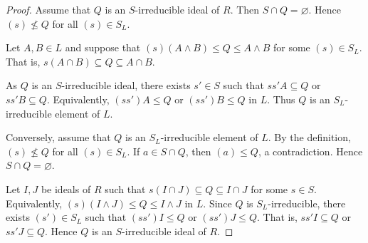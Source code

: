 \documentclass[10pt,a4paper]{amsart}
\begin{document}
\begin{proof}
	Assume that $Q$ is an $S$-irreducible ideal of $R$.
	Then $S\cap Q=\varnothing$.
	Hence $(s)\nleq Q$ for all $(s)\in S_L$.
	
	Let $A,B\in L$ and suppose that
	$(s)(A\wedge B)\leq Q\leq A\wedge B$
	for some $(s)\in S_L$.
	That is,
	$s(A\cap B)\subseteq Q\subseteq A\cap B$.

	As $Q$ is an $S$-irreducible ideal, there exists $s'\in S$ such that
	$ss'A\subseteq Q$ or $ss'B\subseteq Q$.
	Equivalently,
	$(ss')A\leq Q$ or $(ss')B\leq Q$ in $L$.
	Thus $Q$ is an $S_L$-irreducible element of $L$.
	
	Conversely, assume that $Q$ is an $S_L$-irreducible element of $L$.
	By the definition, $(s)\nleq Q$ for all $(s)\in S_L$.
	If $a\in S\cap Q$, then $(a)\leq Q$, a contradiction.
	Hence $S\cap Q=\varnothing$.
	
	Let $I,J$ be ideals of $R$ such that
	$s(I\cap J)\subseteq Q\subseteq I\cap J$
	for some $s\in S$.
	Equivalently,
	$(s)(I\wedge J)\leq Q\leq I\wedge J$ in $L$.
	Since $Q$ is $S_L$-irreducible, there exists $(s')\in S_L$ such that
	$(ss')I\leq Q$ or $(ss')J\leq Q$.
	That is,
	$ss'I\subseteq Q$ or $ss'J\subseteq Q$.
	Hence $Q$ is an $S$-irreducible ideal of $R$.
\end{proof}
\end{document}
